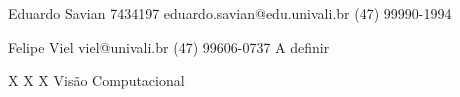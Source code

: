 
\begin{FirstPagetext}
\end{FirstPagetext}

\vspace{0.25cm}

\begin{Academico}
{Eduardo Savian}
{7434197}
{eduardo.savian@edu.univali.br}
{(47) 99990-1994}
\end{Academico}

\begin{Orientador}
{Felipe Viel}
{viel@univali.br}
{(47) 99606-0737}
{A definir}
\end{Orientador}


\begin{Modalidade}
{X} {\nX}
{X} {\nX} {\nX}
{X} {\nX}
{Visão Computacional}
\end{Modalidade}

\begin{Assinaturas}
\end{Assinaturas}

\begin{rodape}
\end{rodape}